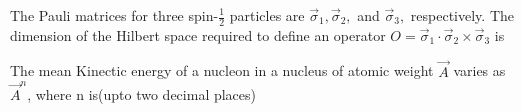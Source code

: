     \item The Pauli matrices for three spin-$\frac{1}{2}$ particles are $\vec{\sigma}_1, \vec{\sigma}_2,$ and $\vec{\sigma}_3,$ respectively. The dimension of the Hilbert space required to define an operator $O = \vec{\sigma}_1 \cdot\vec{\sigma}_2 \times \vec{\sigma}_3$ is \underline{\phantom{black}}

    \item The mean Kinectic energy of a nucleon in a nucleus of atomic weight $\vec{A}$ varies as $\vec{A}^n$, where n is\underline{\phantom{black}}(upto two decimal places)

